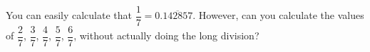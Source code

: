 
%
%
%
%
% 

\question[4] You can easily calculate that $\dfrac{1}{7}=0.\overline{142857}$. However, can you calculate the values of $\dfrac{2}{7}$, $\dfrac{3}{7}$, $\dfrac{4}{7}$, $\dfrac{5}{7}$, $\dfrac{6}{7}$, without actually doing the long division?

